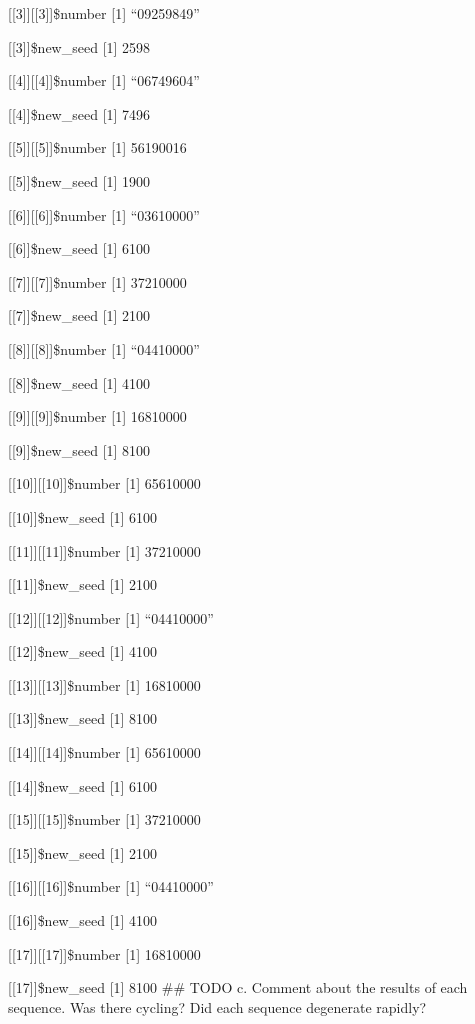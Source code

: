 \documentclass[]{article}
\begin{document}
{[}{[}3{]}{]}{[}{[}3{]}{]}\$number {[}1{]} ``09259849''

{[}{[}3{]}{]}\$new\_seed {[}1{]} 2598

{[}{[}4{]}{]}{[}{[}4{]}{]}\$number {[}1{]} ``06749604''

{[}{[}4{]}{]}\$new\_seed {[}1{]} 7496

{[}{[}5{]}{]}{[}{[}5{]}{]}\$number {[}1{]} 56190016

{[}{[}5{]}{]}\$new\_seed {[}1{]} 1900

{[}{[}6{]}{]}{[}{[}6{]}{]}\$number {[}1{]} ``03610000''

{[}{[}6{]}{]}\$new\_seed {[}1{]} 6100

{[}{[}7{]}{]}{[}{[}7{]}{]}\$number {[}1{]} 37210000

{[}{[}7{]}{]}\$new\_seed {[}1{]} 2100

{[}{[}8{]}{]}{[}{[}8{]}{]}\$number {[}1{]} ``04410000''

{[}{[}8{]}{]}\$new\_seed {[}1{]} 4100

{[}{[}9{]}{]}{[}{[}9{]}{]}\$number {[}1{]} 16810000

{[}{[}9{]}{]}\$new\_seed {[}1{]} 8100

{[}{[}10{]}{]}{[}{[}10{]}{]}\$number {[}1{]} 65610000

{[}{[}10{]}{]}\$new\_seed {[}1{]} 6100

{[}{[}11{]}{]}{[}{[}11{]}{]}\$number {[}1{]} 37210000

{[}{[}11{]}{]}\$new\_seed {[}1{]} 2100

{[}{[}12{]}{]}{[}{[}12{]}{]}\$number {[}1{]} ``04410000''

{[}{[}12{]}{]}\$new\_seed {[}1{]} 4100

{[}{[}13{]}{]}{[}{[}13{]}{]}\$number {[}1{]} 16810000

{[}{[}13{]}{]}\$new\_seed {[}1{]} 8100

{[}{[}14{]}{]}{[}{[}14{]}{]}\$number {[}1{]} 65610000

{[}{[}14{]}{]}\$new\_seed {[}1{]} 6100

{[}{[}15{]}{]}{[}{[}15{]}{]}\$number {[}1{]} 37210000

{[}{[}15{]}{]}\$new\_seed {[}1{]} 2100

{[}{[}16{]}{]}{[}{[}16{]}{]}\$number {[}1{]} ``04410000''

{[}{[}16{]}{]}\$new\_seed {[}1{]} 4100

{[}{[}17{]}{]}{[}{[}17{]}{]}\$number {[}1{]} 16810000

{[}{[}17{]}{]}\$new\_seed {[}1{]} 8100 \#\# TODO c. Comment about the
results of each sequence. Was there cycling? Did each sequence
degenerate rapidly?
\end{document}
